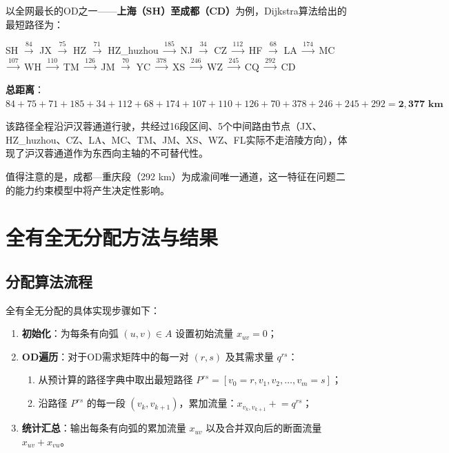 \documentclass[12pt,a4paper,fontset=none]{ctexart}
\begin{document}
以全网最长的OD之一——\textbf{上海（SH）至成都（CD）}为例，Dijkstra算法给出的最短路径为：

\begin{center}
\small
SH $\xrightarrow{84}$ JX $\xrightarrow{75}$ HZ $\xrightarrow{71}$ HZ\_huzhou $\xrightarrow{185}$ NJ $\xrightarrow{34}$ CZ $\xrightarrow{112}$ HF $\xrightarrow{68}$ LA $\xrightarrow{174}$ MC $\xrightarrow{107}$ WH $\xrightarrow{110}$ TM $\xrightarrow{126}$ JM $\xrightarrow{70}$ YC $\xrightarrow{378}$ XS $\xrightarrow{246}$ WZ $\xrightarrow{245}$ CQ $\xrightarrow{292}$ CD
\end{center}

\textbf{总距离}：$84+75+71+185+34+112+68+174+107+110+126+70+378+246+245+292 = \mathbf{2,377 \text{ km}}$

该路径全程沿沪汉蓉通道行驶，共经过16段区间、5个中间路由节点（JX、HZ\_huzhou、CZ、LA、MC、TM、JM、XS、WZ、FL实际不走涪陵方向），体现了沪汉蓉通道作为东西向主轴的不可替代性。

值得注意的是，成都—重庆段（292 km）为成渝间唯一通道，这一特征在问题二的能力约束模型中将产生决定性影响。

\section{全有全无分配方法与结果}

\subsection{分配算法流程}

全有全无分配的具体实现步骤如下：

\begin{enumerate}[leftmargin=*]
    \item \textbf{初始化}：为每条有向弧 $(u,v) \in A$ 设置初始流量 $x_{uv} = 0$；
    \item \textbf{OD遍历}：对于OD需求矩阵中的每一对 $(r,s)$ 及其需求量 $q^{rs}$：
    \begin{enumerate}
        \item 从预计算的路径字典中取出最短路径 $P^{rs} = [v_0=r, v_1, v_2, \ldots, v_m=s]$；
        \item 沿路径 $P^{rs}$ 的每一段 $(v_k, v_{k+1})$，累加流量：$x_{v_k, v_{k+1}} \mathrel{+}= q^{rs}$；
    \end{enumerate}
    \item \textbf{统计汇总}：输出每条有向弧的累加流量 $x_{uv}$ 以及合并双向后的断面流量 $x_{uv} + x_{vu}$。
\end{enumerate}
\end{document}
